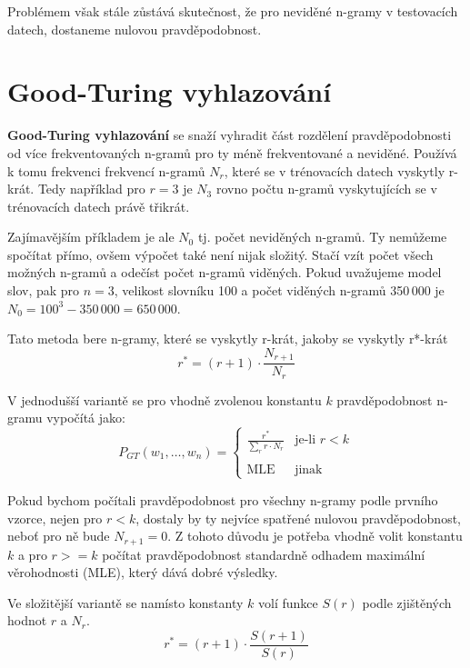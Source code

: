 \documentclass[12pt,a4paper]{report}
\begin{document}
Problémem však stále zůstává skutečnost, že pro neviděné n-gramy v testovacích datech, dostaneme nulovou pravděpodobnost.

\section{Good-Turing vyhlazování}
\textbf{Good-Turing vyhlazování} se snaží vyhradit část rozdělení pravděpodobnosti od více frekventovaných n-gramů pro ty méně frekventované a neviděné. Používá k tomu frekvenci frekvencí n-gramů $N_r$, které se v trénovacích datech vyskytly r-krát. Tedy například pro $r=3$ je $N_3$ rovno počtu n-gramů vyskytujících se v trénovacích datech právě třikrát. 

Zajímavějším příkladem je ale $N_0$ tj. počet neviděných n-gramů. Ty nemůžeme spočítat přímo, ovšem výpočet také není nijak složitý. Stačí vzít počet všech možných n-gramů a odečíst počet n-gramů viděných. Pokud uvažujeme model slov, pak pro $n=3$, velikost slovníku 100 a počet viděných n-gramů 350\,000 je $N_0 = 100^3 - 350\,000 = 650\,000$.

Tato metoda bere n-gramy, které se vyskytly r-krát, jakoby se vyskytly r*-krát
\begin{equation}\label{eq:gtr1}
r^* = (r+1) \cdot \frac {N_{r+1}}{N_r}
\end{equation}

V jednodušší variantě se pro vhodně zvolenou konstantu $k$ pravděpodobnost n-gramu vypočítá jako:
\begin{equation}
P_{GT}(w_{1},\ldots,w_{n}) = \left\{
\begin{array}{ll}
\displaystyle \frac{r^*}{\sum_{r}r\cdot N_r} & \text{je-li $r < k$}\\
&\\
\text{MLE} & \text{jinak}
\end{array} \right.
\end{equation}

Pokud bychom počítali pravděpodobnost pro všechny n-gramy podle prvního vzorce, nejen pro $r < k$, dostaly by ty nejvíce spatřené nulovou pravděpodobnost, neboť pro ně bude $N_{r+1} = 0$. Z tohoto důvodu je potřeba vhodně volit konstantu $k$ a pro $r >= k$ počítat pravděpodobnost standardně odhadem maximální věrohodnosti (MLE), který dává dobré výsledky.

Ve složitější variantě se namísto konstanty $k$ volí funkce $S(r)$ podle zjištěných hodnot $r$ a $N_r$.
\begin{equation}\label{eq:gtr2}
r^* = (r+1) \cdot \frac {S(r+1)}{S(r)}
\end{equation}
\end{document}
